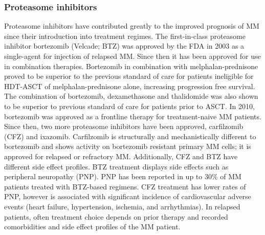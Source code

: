 

\subsubsection{Proteasome inhibitors}
Proteasome inhibitors have contributed greatly to the improved prognosis of MM since their introduction into treatment regimes.
The first-in-class proteasome inhibitor bortezomib (Velcade\textsuperscript{\textregistered}; BTZ) was approved by the FDA in 2003 as a single-agent for injection of relapsed MM\cite{kane2003velcade}.
Since then it has been approved for use in combination therapies.
Bortezomib in combination with melphalan-prednisone proved to be superior to the previous standard of care for patients ineligible for HDT-ASCT of melphalan-prednisone alone, increasing progression free survival\cite{san2008bortezomib}.
The combination of bortezomib, dexamethasone and thalidomide  was also shown to be superior to previous standard of care for patients prior to ASCT\cite{moreau2012proteasome}.
In 2010, bortezomib was approved as a frontline therapy for treatment-naive MM patients.
Since then, two more proteasome inhibitors have been approved, carfilzomib (CFZ) and ixazomib.
Carfilzomib is structurally and mechanistically different to bortezomib and shows activity on bortezomib resistant primary MM cells\cite{moreau2012proteasome}; it is approved for relapsed or refractory MM\@.
Additionally, CFZ and BTZ have different side effect profiles.
BTZ treatment displays side effects such as peripheral neuropathy (PNP).
PNP has been reported in up to 30\% of MM patients treated with BTZ-based regimens\cite{mushtaq2018efficacy}.
CFZ treatment has lower rates of PNP, however is associated with significant incidence of cardiovascular adverse events (heart failure, hypertension, ischemia, and arrhythmias)\cite{waxman2018carfilzomib}.
In relapsed patients, often treatment choice depends on prior therapy and recorded comorbidities and side effect profiles of the MM patient.

